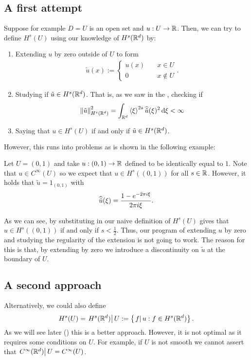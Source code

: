 \documentclass[
    a4paper,
    DIV=14,
    abstract=true,
    numbers=noenddot
]{scrartcl}
\begin{document}
\subsection{A first attempt}
Suppose for example $D=U$ is an open set and $u: U \to \mathbb{R}$. Then, we can try to define $H^s(U)$ using our knowledge of $H^s(\mathbb{R}^d)$ by:
\begin{enumerate}
	\item Extending $u$ by zero outside of $U$ to form
	      \begin{align*}
		      \tilde{u}(x):=\begin{cases}
			                    u(x) & \quad x \in U     \\
			                    0    & \quad x \not\in U
		                    \end{cases}.
	      \end{align*}
	\item Studying if $\tilde{u} \in  H^s(\mathbb{R}^d)$. That is, as we saw in the , checking if
	      \begin{align*}
		      \left\lVert \tilde{u} \right\rVert_{H^s(\mathbb{R}^d)}^2= \int_{\mathbb{R}^d}\left\langle\xi \right\rangle^{2s}\widehat{\tilde{u}}(\xi )^2 \,\mathrm{d} \xi < \infty
	      \end{align*}
	\item Saying that $u \in H^s(U)$ if and only if $\tilde{u} \in H^s(\mathbb{R}^d)$.
\end{enumerate}
However, this runs into problems as is shown in the following example:
\begin{example}
	Let $U=(0,1)$ and take $u: (0,1) \to \mathbb{R}$ defined to be identically equal to  $1$. Note that  $u \in C^\infty(U)$ so we expect that $u \in H^s((0,1))$ for all $s \in \mathbb{R}$. However, it holds that $\tilde{u}= {1}_{(0,1)}$ with
	\begin{align*}
		\widehat{\tilde{u}}(\xi )=\frac{1-e^{-2 \pi i \xi }}{2 \pi i \xi }.
	\end{align*}
\end{example}
As we can see, by substituting in our naive definition of $H^s(U)$ gives that $u \in H^s((0,1))$ if and only if $s< \frac{1}{2}$. Thus, our program of extending $u$ by zero and studying the regularity of the extension is not going to work. The reason for this is that, by extending by zero we introduce a discontinuity on $\tilde{u}$ at the boundary of $U$.
\subsection{A second approach}
Alternatively, we could also define
\begin{align*}
	H^s(U)= \left.H^s(\mathbb{R}^d)\right|{U}:= \left\{\left.f\right|{u}: f \in H^s(\mathbb{R}^d)\right\} .
\end{align*}
As we will see later () this is a better approach. However, it is not optimal as it requires some conditions on $U$. For example, if $U$ is not smooth we cannot assert that  $\left.C^\infty(\mathbb{R}^d)\right|{U}= C^\infty(U)$.
\end{document}
